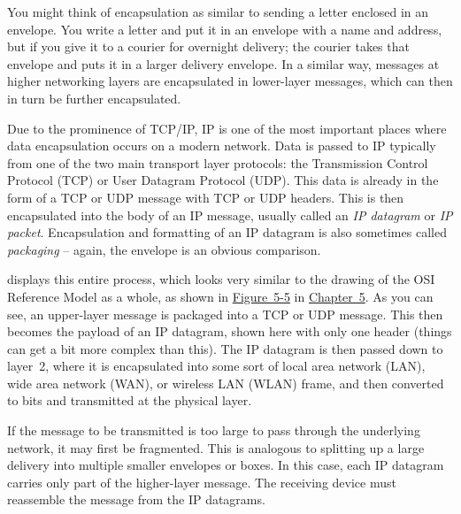 You might think of encapsulation as similar to sending a letter enclosed
in an envelope.
You write a letter and put it in an envelope with a name and address, but if you give it to a courier for overnight delivery;
the courier takes that envelope and puts it in a larger delivery envelope.
In a similar way, messages at higher networking layers are encapsulated in lower-layer messages, which can then in turn be further encapsulated.

Due to the prominence of TCP/IP, IP is one of the most important places
where data encapsulation occurs on a modern network. Data is passed to
IP typically from one of the two main transport layer protocols: the
Transmission Control Protocol (TCP) or User Datagram Protocol (UDP).
This data is already in the form of a TCP or UDP message with TCP or UDP
headers. This is then encapsulated into the body of an IP message,
usually called an \emph{IP datagram} or \emph{IP packet}.
Encapsulation and formatting of an IP datagram is also sometimes called \emph{packaging} -- again, the envelope is an obvious comparison.

 displays this entire process, which looks very similar to the drawing of
the OSI Reference Model as a whole, as shown in
\protect\hyperlink{ch05s03.htmlux5cux23osi_reference_model_data_encapsulation_e}{Figure~5-5} in \protect\hyperlink{ch05.html}{Chapter~5}.
As you can see, an upper-layer message is packaged into a TCP or UDP message.
This then becomes the payload of an IP datagram, shown here with only one header
(things can get a bit more complex than this). The IP datagram is then
passed down to layer~2, where it is encapsulated into some sort of local
area network (LAN), wide area network (WAN), or wireless LAN (WLAN)
frame, and then converted to bits and transmitted at the physical layer.

If the message to be transmitted is too large to pass through the
underlying network, it may first be fragmented. This is analogous to
splitting up a large delivery into multiple smaller envelopes or boxes.
In this case, each IP datagram carries only part of the higher-layer
message. The receiving device must reassemble the message from the IP
datagrams.



